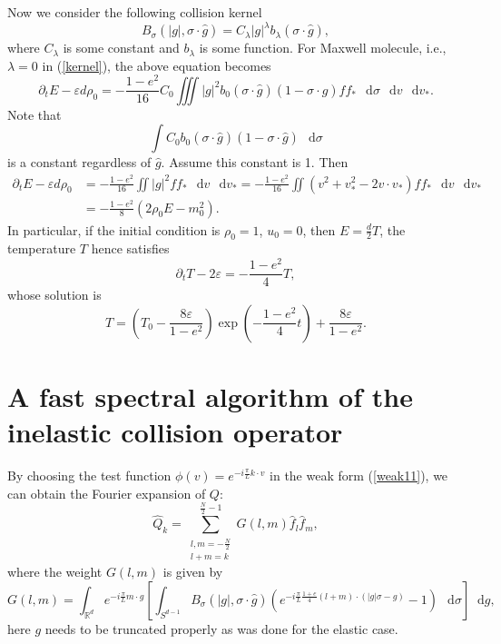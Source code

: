 \documentclass[review, times]{elsarticle}
\newcommand*\diff{\mathop{}\!\mathrm{d}}
\begin{document}
Now we consider the following collision kernel
\begin{equation} \label{kernel}
B_{\sigma}(|g|,\sigma\cdot \hat{g})=C_{\lambda}|g|^{\lambda}b_{\lambda}(\sigma\cdot \hat{g}),
\end{equation}
where $C_{\lambda}$ is some constant and $b_{\lambda}$ is some function. For Maxwell molecule, i.e., $\lambda=0$ in (\ref{kernel}), the above equation becomes
\begin{equation} 
\partial_t E -\varepsilon d\rho_0=-\frac{1-e^2}{16}C_0\iiint |g|^{2}b_0(\sigma\cdot \hat{g})(1-\sigma\cdot \hat{g})ff_*\,\diff{\sigma}\,\diff{v}\,\diff{v_*}.
\end{equation}
Note that
\begin{equation}
\int C_0b_0(\sigma\cdot \hat{g})(1-\sigma\cdot \hat{g})\,\diff{\sigma}
\end{equation}
is a constant regardless of $\hat{g}$. Assume this constant is 1. Then
\begin{align} 
\partial_t E -\varepsilon d\rho_0&=-\frac{1-e^2}{16}\iint |g|^{2}ff_*\,\diff{v}\,\diff{v_*}=-\frac{1-e^2}{16}\iint (v^2+v_*^2-2v\cdot v_*)ff_*\,\diff{v}\,\diff{v_*}\nonumber\\
&=-\frac{1-e^2}{8}(2\rho_0E-m_0^2).
\end{align}
In particular, if the initial condition is $\rho_0=1$, $u_0=0$, then $E=\frac{d}{2}T$, the temperature $T$ hence satisfies
\begin{equation}
\partial_t T-2\varepsilon =-\frac{1-e^2}{4}T,
\end{equation}
whose solution is
\begin{equation}\label{soln:T}
T=\left(T_0-\frac{8\varepsilon}{1-e^2}\right)\exp{\left(-\frac{1-e^2}{4}t\right)}+\frac{8\varepsilon}{1-e^2}.
\end{equation}

\section{A fast spectral algorithm of the inelastic collision operator}

By choosing the test function $\phi(v)=e^{-i\frac{\pi}{L}k\cdot v}$ in the weak form (\ref{weak11}), we can obtain the Fourier expansion of $Q$:
\vspace{-0.05in}
\begin{equation} \label{sum1}
\hat{Q}_k=\sum_{\substack{l,m=-\frac{N}{2}\\l+m=k}}^{\frac{N}{2}-1}G(l,m)\hat{f}_l\hat{f}_m,
\end{equation} 
where the weight $G(l,m)$ is given by
\begin{equation*} 
G(l,m)=\int_{\mathbb{R}^d}e^{-i\frac{\pi}{L}m \cdot g}\left[\int_{S^{d-1}}B_{\sigma}(|g|,\sigma\cdot \hat{g})\left(e^{-i\frac{\pi}{L}\frac{1+e}{4}(l+m)\cdot (|g|\sigma-g)}-1\right)\,\diff{\sigma}\right]\diff{g},
\end{equation*}
here $g$ needs to be truncated properly as was done for the elastic case. 
\end{document}
